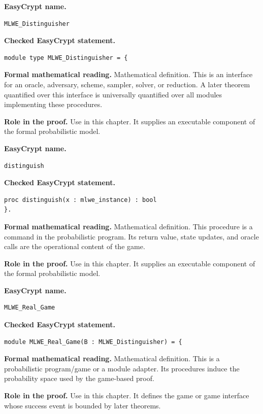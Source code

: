 \begin{formaldefinition}
\noindent\textbf{EasyCrypt name.}
\begin{lstlisting}[language=EasyCrypt,basicstyle=\ttfamily\scriptsize]
MLWE_Distinguisher
\end{lstlisting}
\noindent\textbf{Checked EasyCrypt statement.}
\begin{lstlisting}[language=EasyCrypt,basicstyle=\ttfamily\scriptsize]
module type MLWE_Distinguisher = {
\end{lstlisting}
\noindent\textbf{Formal mathematical reading.}
Mathematical definition. This is an interface for an oracle, adversary, scheme, sampler, solver, or reduction.  A later theorem quantified over this interface is universally quantified over all modules implementing these procedures.

\noindent\textbf{Role in the proof.}
Use in this chapter. It supplies an executable component of the formal probabilistic model.

\end{formaldefinition}

\begin{formaldefinition}
\noindent\textbf{EasyCrypt name.}
\begin{lstlisting}[language=EasyCrypt,basicstyle=\ttfamily\scriptsize]
distinguish
\end{lstlisting}
\noindent\textbf{Checked EasyCrypt statement.}
\begin{lstlisting}[language=EasyCrypt,basicstyle=\ttfamily\scriptsize]
proc distinguish(x : mlwe_instance) : bool
}.
\end{lstlisting}
\noindent\textbf{Formal mathematical reading.}
Mathematical definition. This procedure is a command in the probabilistic program.  Its return value, state updates, and oracle calls are the operational content of the game.

\noindent\textbf{Role in the proof.}
Use in this chapter. It supplies an executable component of the formal probabilistic model.

\end{formaldefinition}

\begin{formaldefinition}
\noindent\textbf{EasyCrypt name.}
\begin{lstlisting}[language=EasyCrypt,basicstyle=\ttfamily\scriptsize]
MLWE_Real_Game
\end{lstlisting}
\noindent\textbf{Checked EasyCrypt statement.}
\begin{lstlisting}[language=EasyCrypt,basicstyle=\ttfamily\scriptsize]
module MLWE_Real_Game(B : MLWE_Distinguisher) = {
\end{lstlisting}
\noindent\textbf{Formal mathematical reading.}
Mathematical definition. This is a probabilistic program/game or a module adapter.  Its procedures induce the probability space used by the game-based proof.

\noindent\textbf{Role in the proof.}
Use in this chapter. It defines the game or game interface whose success event is bounded by later theorems.

\end{formaldefinition}

